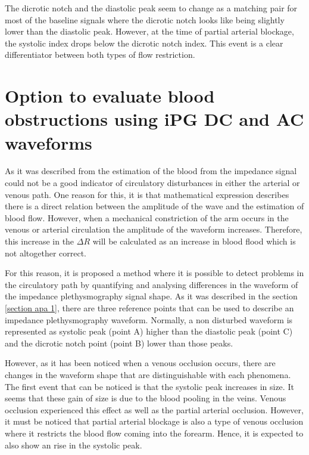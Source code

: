 The dicrotic notch and the diastolic peak seem to change as a matching pair for most of the baseline signals where the dicrotic notch looks like being slightly lower than the diastolic peak. However, at the time of partial arterial blockage, the systolic index drops below the dicrotic notch index. This event is a clear differentiator between both types of flow restriction.

\section{Option to evaluate blood obstructions using iPG DC and AC waveforms}  %
\label{section discussion 5}
As it was described from the estimation of the blood from the impedance signal could not be a good indicator of circulatory disturbances in either the arterial or venous path. One reason for this, it is that mathematical expression describes there is a direct relation between the amplitude of the wave and the estimation of blood flow. However, when a mechanical constriction of the arm occurs in the venous or arterial circulation the amplitude of the waveform increases. Therefore, this increase in the $\Delta R$ will be calculated as an increase in blood flood which is not altogether correct. 

For this reason, it is proposed a method where it is possible to detect problems in the circulatory path by quantifying and analysing differences in the waveform of the impedance plethysmography signal shape. As it was described in the section \ref{section apa 1}, there are three reference points that can be used to describe an impedance plethysmography waveform. Normally, a non disturbed waveform is represented as systolic peak (point A) higher than the diastolic peak (point C) and the dicrotic notch point (point B) lower than those peaks. 

However, as it has been noticed when a venous occlusion occurs, there are changes in the waveform shape that are distinguishable with each phenomena. The first event that can be noticed is that the systolic peak increases in size. It seems that these gain of size is due to the blood pooling in the veins. Venous occlusion experienced this effect as well as the partial arterial occlusion. However, it must be noticed that partial arterial blockage is also a type of venous occlusion where it restricts the blood flow coming into the forearm. Hence, it is expected to also show an rise in the systolic peak. 

